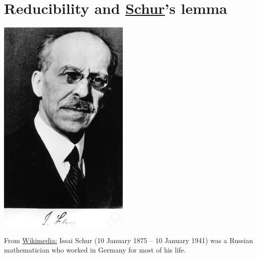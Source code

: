 \documentclass[../main.tex]{subfiles}
\begin{document}
\section[Reducibility and Schur's lemma]{Reducibility and \href{https://en.wikipedia.org/wiki/Issai_Schur}{Schur}'s lemma}
\begin{marginfigure}
	\includegraphics[width=1\linewidth]{images/Schur.jpg}
	\caption[Photo of Issai Schur]{From \href{https://en.wikipedia.org/wiki/Issai_Schur\#/media/File:Schur.jpg}{Wikimedia:} Issai Schur (10 January 1875 – 10 January 1941) was a Russian mathematician who worked in Germany for most of his life.}
\end{marginfigure}
\end{document}
